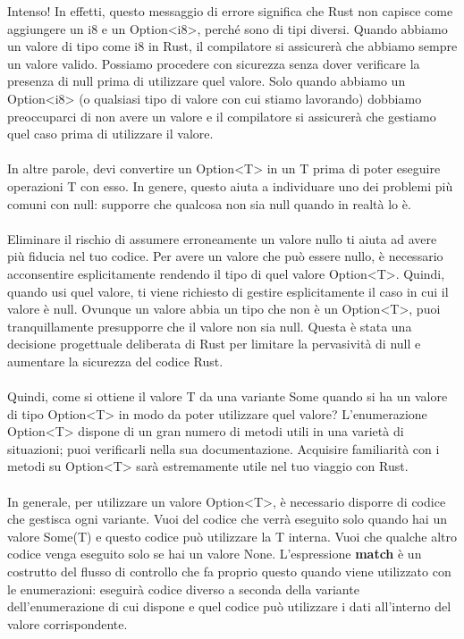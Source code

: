 \documentclass[11pt,a4paper]{article}
\begin{document}
Intenso! In effetti, questo messaggio di errore significa che Rust non capisce come aggiungere un i8 e un Option<i8>, perché sono di tipi diversi. Quando abbiamo un valore di tipo come i8 in Rust, il compilatore si assicurerà che abbiamo sempre un valore valido. Possiamo procedere con sicurezza senza dover verificare la presenza di null prima di utilizzare quel valore. Solo quando abbiamo un Option<i8> (o qualsiasi tipo di valore con cui stiamo lavorando) dobbiamo preoccuparci di non avere un valore e il compilatore si assicurerà che gestiamo quel caso prima di utilizzare il valore.\\
\\
In altre parole, devi convertire un Option<T> in un T prima di poter eseguire operazioni T con esso. In genere, questo aiuta a individuare uno dei problemi più comuni con null: supporre che qualcosa non sia null quando in realtà lo è.\\
\\
Eliminare il rischio di assumere erroneamente un valore nullo ti aiuta ad avere più fiducia nel tuo codice. Per avere un valore che può essere nullo, è necessario acconsentire esplicitamente rendendo il tipo di quel valore Option<T>. Quindi, quando usi quel valore, ti viene richiesto di gestire esplicitamente il caso in cui il valore è null. Ovunque un valore abbia un tipo che non è un Option<T>, puoi tranquillamente presupporre che il valore non sia null. Questa è stata una decisione progettuale deliberata di Rust per limitare la pervasività di null e aumentare la sicurezza del codice Rust.\\
\\
Quindi, come si ottiene il valore T da una variante Some quando si ha un valore di tipo Option<T> in modo da poter utilizzare quel valore? L'enumerazione Option<T> dispone di un gran numero di metodi utili in una varietà di situazioni; puoi verificarli nella sua documentazione. Acquisire familiarità con i metodi su Option<T> sarà estremamente utile nel tuo viaggio con Rust.\\
\\
In generale, per utilizzare un valore Option<T>, è necessario disporre di codice che gestisca ogni variante. Vuoi del codice che verrà eseguito solo quando hai un valore Some(T) e questo codice può utilizzare la T interna. Vuoi che qualche altro codice venga eseguito solo se hai un valore None. L'espressione \textbf{match} è un costrutto del flusso di controllo che fa proprio questo quando viene utilizzato con le enumerazioni: eseguirà codice diverso a seconda della variante dell'enumerazione di cui dispone e quel codice può utilizzare i dati all'interno del valore corrispondente.
\end{document}
